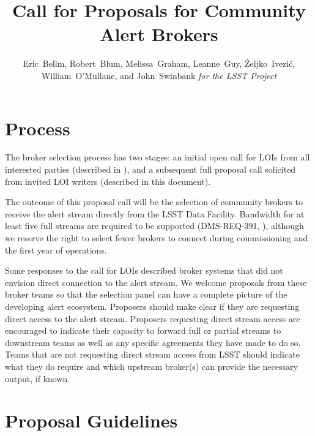 \documentclass[DM,toc,lsstdraft]{lsstdoc}
\title{Call for Proposals for Community Alert Brokers}
\author{
Eric~Bellm,
Robert~Blum,
Melissa~Graham,
Leanne~Guy,
\v{Z}eljko~Ivezi\'{c},
William~O'Mullane,
and John~Swinbank
\emph{for the LSST Project}
}
\begin{document}

\maketitle

\section{Process}

The broker selection process has two stages:
an initial open call for LOIs from all interested parties (described in ), and a subsequent full proposal call solicited from invited LOI writers (described in this document).

The outcome of this proposal call will be the selection of community brokers to receive the alert stream directly from the LSST Data Facility.
Bandwidth for at least five full streams are required to be supported (DMS-REQ-391, ), although we reserve the right to select fewer brokers to connect during commissioning and the first year of operations.

Some responses to the call for LOIs described broker systems that did not envision direct connection to the alert stream.
We welcome proposals from these broker teams so that the selection panel can have a complete picture of the developing alert ecosystem.
Proposers should make clear if they are requesting direct access to the alert stream.
Proposers requesting direct stream access are encouraged to indicate their capacity to forward full or partial streams to downstream teams as well as any specific agreements they have made to do so. 
Teams that are not requesting direct stream access from LSST should indicate what they do require and which upstream broker(s) can provide the necessary output, if known.


\section{Proposal Guidelines}
\end{document}
